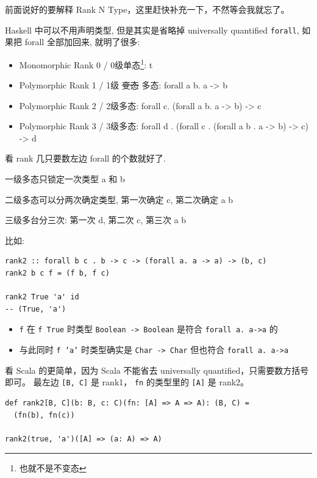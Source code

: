 \documentclass[letterspacing]{tufte-book}
\begin{document}
前面说好的要解释 Rank N Type，这里赶快补充一下，不然等会我就忘了。

Haskell 中可以不用声明类型, 但是其实是省略掉 universally quantified \texttt{forall}, 如果把 forall 全部加回来,
就明了很多:

\begin{itemize}
\item Monomorphic Rank 0 / 0级单态\footnote{也就不是不变态}: t
\item Polymorphic Rank 1 / 1级 \sout{变态} 多态: forall a b. a -> b
\item Polymorphic Rank 2 / 2级多态: forall c. (forall a b. a -> b) -> c
\item Polymorphic Rank 3 / 3级多态: forall d . (forall c . (forall a b . a -> b) -> c) -> d
\end{itemize}

看 rank 几只要数左边 forall 的个数就好了.

一级多态只锁定一次类型 a 和 b

二级多态可以分两次确定类型, 第一次确定 c, 第二次确定 a b

三级多台分三次: 第一次 d, 第二次 c, 第三次 a b

比如:

\lstset{language=haskell,label= ,caption= ,captionpos=b,numbers=none}
\begin{lstlisting}
rank2 :: forall b c . b -> c -> (forall a. a -> a) -> (b, c)
rank2 b c f = (f b, f c)

rank2 True 'a' id
-- (True, 'a')
\end{lstlisting}

\begin{itemize}
\item \texttt{f} 在 \texttt{f True} 时类型 \texttt{Boolean -> Boolean} 是符合 \texttt{forall a. a->a} 的
\item 与此同时 \texttt{f 'a'} 时类型确实是 \texttt{Char -> Char} 但也符合 \texttt{forall a. a->a}
\end{itemize}

看 Scala 的更简单，因为 Scala 不能省去 universally quantified，只需要数方括号即可。
最左边 \texttt{[B, C]} 是 rank1， \texttt{fn} 的类型里的 \texttt{[A]} 是 rank2。

\lstset{language=scala,label= ,caption= ,captionpos=b,numbers=none}
\begin{lstlisting}
def rank2[B, C](b: B, c: C)(fn: [A] => A => A): (B, C) =
  (fn(b), fn(c))

rank2(true, 'a')([A] => (a: A) => A)
\end{lstlisting}
\end{document}
